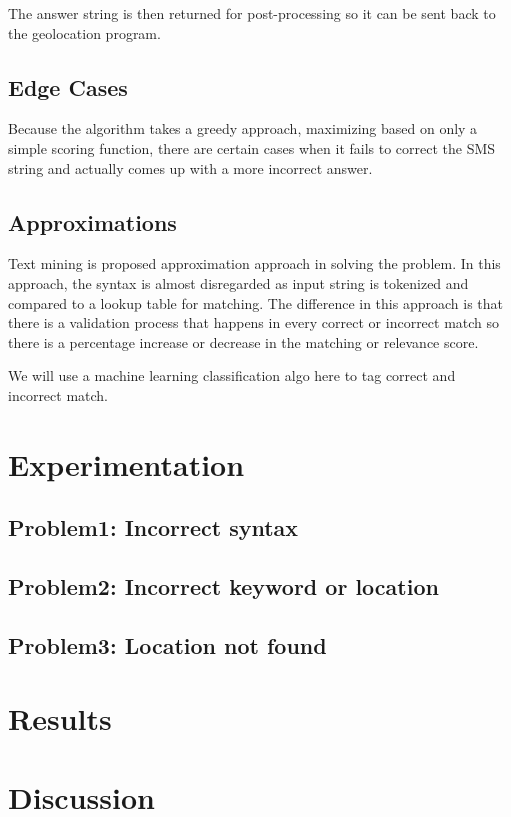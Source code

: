 \documentclass{acm_proc_article-sp}
\begin{document}
The answer string is then returned for post-processing so it can be sent back to the geolocation program. 

\subsection{Edge Cases} 
Because the algorithm takes a greedy approach, maximizing based on only a simple scoring function, there are certain cases when it fails to correct the SMS string and actually comes up with a more incorrect answer. 

\subsection{Approximations}
Text mining is proposed approximation approach in solving the problem. In this approach, the syntax is almost disregarded as input string is tokenized and compared to a lookup table for matching. The difference in this approach is that there is a validation process that happens in every correct or incorrect match so there is a percentage increase or decrease in the matching or relevance score. 

We will use a machine learning classification algo here to tag correct and incorrect match.

\section{Experimentation}
\subsection{Problem1: Incorrect syntax}
\subsection{Problem2: Incorrect keyword or location}
\subsection{Problem3: Location not found}

\section{Results}
\section{Discussion}
\end{document}
